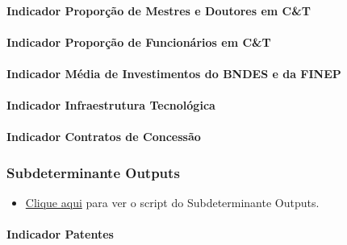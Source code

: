 \documentclass[
  12,
  dvipsnames]{article}
\providecommand{\tightlist}{%
  \setlength{\itemsep}{0pt}\setlength{\parskip}{0pt}}
\begin{document}
\hypertarget{indicador-proporuxe7uxe3o-de-mestres-e-doutores-em-ct}{%
\paragraph{Indicador Proporção de Mestres e Doutores em
C\&T}\label{indicador-proporuxe7uxe3o-de-mestres-e-doutores-em-ct}}

\hypertarget{indicador-proporuxe7uxe3o-de-funcionuxe1rios-em-ct}{%
\paragraph{Indicador Proporção de Funcionários em
C\&T}\label{indicador-proporuxe7uxe3o-de-funcionuxe1rios-em-ct}}

\hypertarget{indicador-muxe9dia-de-investimentos-do-bndes-e-da-finep}{%
\paragraph{Indicador Média de Investimentos do BNDES e da
FINEP}\label{indicador-muxe9dia-de-investimentos-do-bndes-e-da-finep}}

\hypertarget{indicador-infraestrutura-tecnoluxf3gica}{%
\paragraph{Indicador Infraestrutura
Tecnológica}\label{indicador-infraestrutura-tecnoluxf3gica}}

\hypertarget{indicador-contratos-de-concessuxe3o}{%
\paragraph{Indicador Contratos de
Concessão}\label{indicador-contratos-de-concessuxe3o}}

\hypertarget{subdet_output}{%
\subsubsection{Subdeterminante Outputs}\label{subdet_output}}

\begin{itemize}
\tightlist
\item
  \protect\hyperlink{script_2.5.2}{Clique aqui} para ver o script do
  Subdeterminante Outputs.
\end{itemize}

\hypertarget{indicador-patentes}{%
\paragraph{Indicador Patentes}\label{indicador-patentes}}
\end{document}
